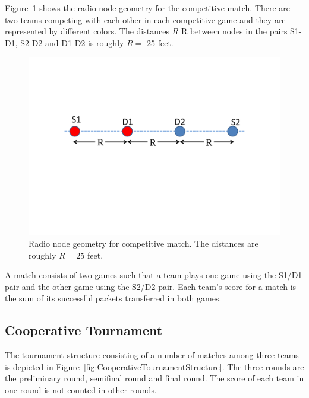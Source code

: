 Figure~\ref{fig:CompetitiveNodeGeometryFinalRound} shows the radio node geometry for the competitive match. There are two teams competing with each other in each competitive game and they are represented by different colors. The distances $R$ R between nodes in the pairs S1-D1, S2-D2 and D1-D2 is roughly $R=$ 25 feet.
\begin{figure}[tpb]
  \begin{center}
    \centerline{\includegraphics[width=150mm]{CompetitiveNodeGeometryFinalRound.pdf}}
    \caption{Radio node geometry for competitive match. The distances are roughly $R=25$ feet.}
    \label{fig:CompetitiveNodeGeometryFinalRound}
  \end{center}
\end{figure}

A match consists of two games such that a team plays one game using the S1/D1 pair and the other game using the S2/D2 pair. Each team's score for a match is the sum of its successful packets transferred in both games.

\subsection{Cooperative Tournament}
The tournament structure consisting of a number of matches among three teams is depicted in Figure~\ref{fig:CooperativeTournamentStructure}. The three rounds are the preliminary round, semifinal round and final round. The score of each team in one round is not counted in other rounds.

